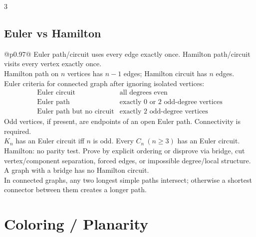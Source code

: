\documentclass[10pt]{article}
\begin{document}
\begin{multicols*}{3}
\subsection*{Euler vs Hamilton}
\begin{tabular}{@{}p{}@{}}
Euler path/circuit uses every edge exactly once. Hamilton path/circuit visits every vertex exactly once.\\
Hamilton path on \(n\) vertices has \(n-1\) edges; Hamilton circuit has \(n\) edges.\\
Euler criteria for connected graph after ignoring isolated vertices:
\[
\begin{array}{c|c}
\text{Euler circuit} & \text{all degrees even}\\
\text{Euler path} & \text{exactly }0\text{ or }2\text{ odd-degree vertices}\\
\text{Euler path but no circuit} & \text{exactly }2\text{ odd-degree vertices}
\end{array}
\]
Odd vertices, if present, are endpoints of an open Euler path. Connectivity is required.\\
\(K_n\) has an Euler circuit iff \(n\) is odd. Every \(C_n\ (n\ge3)\) has an Euler circuit.\\
Hamilton: no parity test. Prove by explicit ordering or disprove via bridge, cut vertex/component separation, forced edges, or impossible degree/local structure. A graph with a bridge has no Hamilton circuit.\\
In connected graphs, any two longest simple paths intersect; otherwise a shortest connector between them creates a longer path.\\
\end{tabular}

\section*{Coloring / Planarity}

\end{multicols*}
\end{document}
